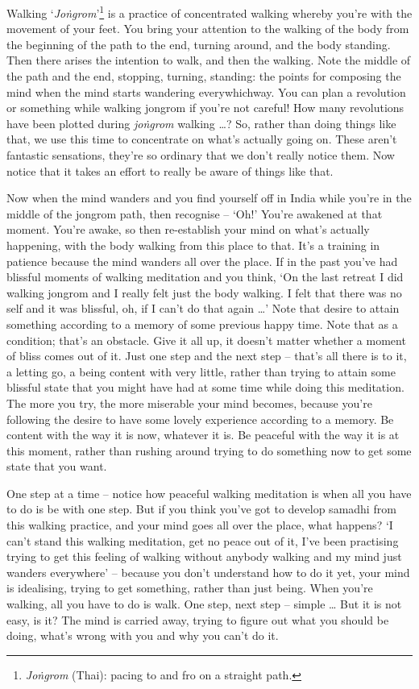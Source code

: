
Walking `\textit{Jo\.ngrom}'\footnote{\textit{Jo\.ngrom} (Thai): pacing to and fro on a straight path.} is a practice of concentrated walking whereby you're with the movement of your feet. You bring your attention to the walking of the body from the beginning of the path to the end, turning around, and the body standing. Then there arises the intention to walk, and then the walking. Note the middle of the path and the end, stopping, turning, standing: the points for composing the mind when the mind starts wandering everywhichway. You can plan a revolution or something while walking jongrom if you're not careful! How many revolutions have been plotted during \textit{jo\.ngrom} walking \ldots{}? So, rather than doing things like that, we use this time to concentrate on what's actually going on. These aren't fantastic sensations, they're so ordinary that we don't really notice them. Now notice that it takes an effort to really be aware of things like that.

Now when the mind wanders and you find yourself off in India while you're in the middle of the jongrom path, then recognise -- `Oh!' You're awakened at that moment. You're awake, so then re-establish your mind on what's actually happening, with the body walking from this place to that. It's a training in patience because the mind wanders all over the place. If in the past you've had blissful moments of walking meditation and you think, `On the last retreat I did walking jongrom and I really felt just the body walking. I felt that there was no self and it was blissful, oh, if I can't do that again \ldots{}' Note that desire to attain something according to a memory of some previous happy time. Note that as a condition; that's an obstacle. Give it all up, it doesn't matter whether a moment of bliss comes out of it. Just one step and the next step -- that's all there is to it, a letting go, a being content with very little, rather than trying to attain some blissful state that you might have had at some time while doing this meditation. The more you try, the more miserable your mind becomes, because you're following the desire to have some lovely experience according to a memory. Be content with the way it is now, whatever it is. Be peaceful with the way it is at this moment, rather than rushing around trying to do something now to get some state that you want.

One step at a time -- notice how peaceful walking meditation is when all you have to do is be with one step. But if you think you've got to develop samadhi from this walking practice, and your mind goes all over the place, what happens? `I can't stand this walking meditation, get no peace out of it, I've been practising trying to get this feeling of walking without anybody walking and my mind just wanders everywhere' -- because you don't understand how to do it yet, your mind is idealising, trying to get something, rather than just being. When you're walking, all you have to do is walk. One step, next step -- simple \ldots{} But it is not easy, is it? The mind is carried away, trying to figure out what you should be doing, what's wrong with you and why you can't do it.

